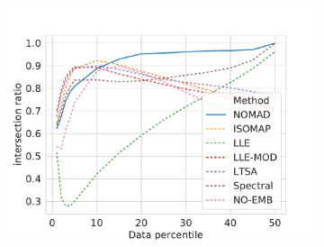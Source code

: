 \documentclass[twoside,11pt]{article}
\begin{document}
\begin{figure}
\begin{subfigure}{\textwidth}
\begin{footnotesize}
\begin{tabu}
		\includegraphics[width=\linewidth]{figures/geodesics/geodesics_circles_orthogonal_noise010} \\


\end{tabu}
\end{footnotesize}
\end{subfigure}
\end{figure}
\end{document}
